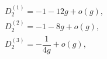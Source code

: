 \begin{equation*}
    \begin{array}{l}
    D^{(1)}_2=-1-12g+o(g),
    \\
    D^{(2)}_2=-1-8g+o(g),
    \\
    D^{(3)}_2=-\dfrac{1}{4g}+o(g),
    \end{array}
\end{equation*}

